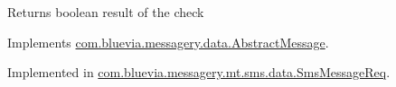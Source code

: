 \begin{DoxyReturn}{Returns}
boolean result of the check 
\end{DoxyReturn}


Implements \hyperlink{classcom_1_1bluevia_1_1messagery_1_1data_1_1AbstractMessage_ad5a798b37381c48c1653200114a70c85}{com.bluevia.messagery.data.AbstractMessage}.



Implemented in \hyperlink{classcom_1_1bluevia_1_1messagery_1_1mt_1_1sms_1_1data_1_1SmsMessageReq_a446f7c2f9be9fcdcb72fa896a40983cb}{com.bluevia.messagery.mt.sms.data.SmsMessageReq}.

